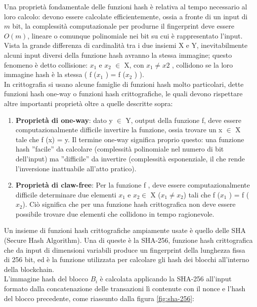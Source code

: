Una proprietà fondamentale delle funzioni hash è relativa al tempo necessario al loro calcolo: devono essere calcolate efficientemente, ossia a fronte di un input di $m$ bit, la complessità computazionale per produrne il fingerprint deve essere $O(m)$, lineare o comunque polinomiale nei bit su cui è rappresentato l’input.\\ Vista la grande differenza di cardinalità tra i due insiemi X e Y, inevitabilmente alcuni input diversi della funzione hash avranno la stessa immagine; questo fenomeno è detto collisione: $x_1$ e $x_2$ $\in$ X, con $x_1 \neq x2$ , collidono se la loro immagine hash è la stessa ( f ($x_1$ ) = f ($x_2$ ) ).\\In crittografia si usano alcune famiglie di funzioni hash molto particolari, dette funzioni hash one-way o funzioni hash crittografiche, le quali devono rispettare altre importanti proprietà oltre a quelle descritte sopra:
\begin{enumerate}
    \item \textbf{Proprietà di one-way}: dato y $\in$ Y, output della funzione f, deve essere computazionalmente difficile invertire la funzione, ossia trovare un x $\in$ X tale che f (x) = y. Il termine one-way significa proprio questo: una funzione hash ”facile” da calcolare (complessità polinomiale nel numero di bit dell’input) ma ”difficile” da invertire (complessità esponenziale, il che rende l’inversione inattuabile all’atto pratico).
    \item \textbf{Proprietà di claw-free}: Per la funzione f , deve essere computazionalmente difficile determinare due elementi $x_1$ e $x_2 \in$ X ($x_1 \neq x_2$) tali che f ($x_1$ ) = f ($x_2$). Ciò significa che per una funzione hash crittografica non deve essere possibile trovare due elementi che collidono in tempo ragionevole.
\end{enumerate}
Un insieme di funzioni hash crittografiche ampiamente usate è quello delle SHA (Secure Hash Algorithm). Una di queste è la SHA-256, funzione hash crittografica che da input di dimensioni variabili produce un fingerprint della lunghezza fissa di 256 bit, ed è la funzione utilizzata per calcolare gli hash dei blocchi all’interno della blockchain.\\L’immagine hash del blocco $B_i$ è calcolata applicando la SHA-256 all’input formato dalla concatenazione delle transazioni lì contenute con il nonce e l’hash del blocco precedente, come riassunto dalla figura \ref{fig:sha-256}:
